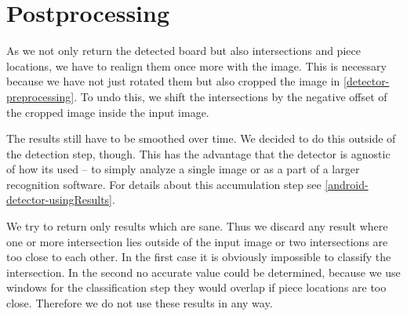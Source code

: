 	\section{Postprocessing}
	As we not only return the detected board but also intersections and piece locations, we have to realign them once more with the image. This is necessary because we have not just rotated them but also cropped the image in \autoref{detector-preprocessing}. To undo this, we shift the intersections by the negative offset of the cropped image inside the input image.

	The results still have to be smoothed over time. We decided to do this outside of the detection step, though. This has the advantage that the detector is agnostic of how its used -- to simply analyze a single image or as a part of a larger recognition software. For details about this accumulation step see \autoref{android-detector-usingResults}.

	We try to return only results which are sane. Thus we discard any result where one or more intersection lies outside of the input image or two intersections are too close to each other. In the first case it is obviously impossible to classify the intersection. In the second no accurate value could be determined, because we use windows for the classification step they would overlap if piece locations are too close. Therefore we do not use these results in any way.
